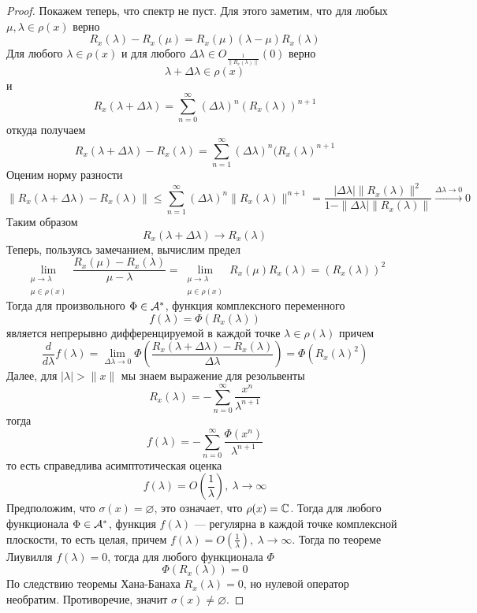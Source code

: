 \begin{proof}
	Покажем теперь, что спектр не пуст. Для этого заметим, что для любых $\mu, \lambda \in \rho(x)$ верно
	$$
	R_x(\lambda) - R_x(\mu) = R_x(\mu) (\lambda - \mu)R_x(\lambda)
 	$$
 	Для любого $\lambda \in \rho(x)$ и для любого $\Delta \lambda \in O_{\frac{1}{\|R_x(\lambda)\|}}(0)$ верно 
 	$$
 	\lambda + \Delta \lambda \in \rho(x)
 	$$
 	и 
 	$$
 	R_x(\lambda + \Delta \lambda) = \sum_{n=0}^\infty (\Delta \lambda)^n (R_x(\lambda))^{n+1}
 	$$
 	откуда получаем
 	$$
 	R_x(\lambda + \Delta \lambda ) - R_x(\lambda) = \sum_{n=1}^\infty (\Delta \lambda)^n (R_x(\lambda)^{n+1}
 	$$
 	Оценим норму разности
 	$$
 	\|R_x(\lambda + \Delta \lambda ) - R_x(\lambda)\| \leq \sum_{n=1}^\infty(\Delta \lambda)^n \|R_x(\lambda)\|^{n+1} = \frac{|\Delta \lambda | \|R_x(\lambda)\|^2}{1 - \|\Delta \lambda | \|R_x(\lambda)\|} \xrightarrow{\Delta \lambda \to 0} 0
 	$$
 	Таким образом 
 	$$
 	R_x(\lambda + \Delta \lambda) \to R_x(\lambda)
 	$$
 	Теперь, пользуясь замечанием, вычислим предел
 	$$
 	\lim\limits_{\substack{\mu \to \lambda \\ \mu \in \rho(x) }}\frac{R_x(\mu) - R_x(\lambda)}{\mu - \lambda} = \lim\limits_{\substack{\mu \to \lambda \\ \mu \in \rho(x) }} R_x(\mu) R_x(\lambda) = (R_x(\lambda))^2
 	$$
 	Тогда для произвольного $\Phi \in \mathcal{A}^*$, функция комплексного переменного 
 	$$
 	f(\lambda) = \Phi(R_x(\lambda))
 	$$
 	является непрерывно дифференцируемой в каждой точке $\lambda \in \rho(\lambda)$ причем 
 	$$
 	\frac{d}{d \lambda} f(\lambda) = \lim\limits_{\Delta \lambda \to 0} \Phi\left(\frac{R_x(\lambda + \Delta \lambda ) - R_x(\lambda)}{\Delta \lambda}\right) = \Phi(R_x(\lambda)^2)
 	$$
 	Далее, для $|\lambda| > \|x\|$ мы знаем выражение для резольвенты 
 	$$
 	R_x(\lambda) = - \sum_{n=0}^\infty \frac{x^n}{\lambda^{n+1}}
 	$$
 	тогда 
 	$$
 	f(\lambda) = - \sum_{n=0}^\infty \frac{\Phi(x^n)}{\lambda^{n+1}}
 	$$
 	то есть справедлива асимптотическая оценка 
 	$$
 	f(\lambda) =  O\left(\frac{1}{\lambda}\right), \ \lambda \to \infty
 	$$
 	Предположим, что $\sigma(x) = \varnothing$, это означает, что $\rho(x) = \mathbb{C}$. Тогда для любого функционала $\Phi \in \mathcal{A}^*$, функция $f(\lambda)$ --- регулярна в каждой точке комплексной плоскости, то есть целая, причем $f(\lambda) = O\left(\frac{1}{\lambda}\right), \ \lambda \to \infty$. Тогда по теореме Лиувилля 	$f(\lambda) = 0$, тогда для любого функционала $\Phi$
 	$$
  \Phi(R_x(\lambda)) = 0
 	$$
 	По следствию теоремы Хана-Банаха $R_x(\lambda) = 0$, но нулевой оператор необратим. Противоречие, значит $\sigma(x) \neq \varnothing$.
\end{proof}
